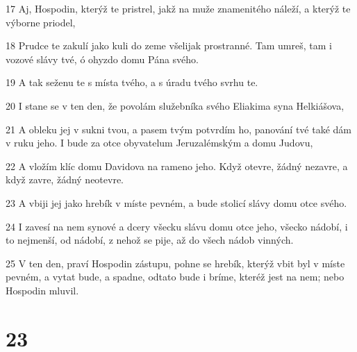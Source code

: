 \par 17 Aj, Hospodin, kterýž te pristrel, jakž na muže znamenitého náleží, a kterýž te výborne priodel,
\par 18 Prudce te zakulí jako kuli do zeme všelijak prostranné. Tam umreš, tam i vozové slávy tvé, ó ohyzdo domu Pána svého.
\par 19 A tak seženu te s místa tvého, a s úradu tvého svrhu te.
\par 20 I stane se v ten den, že povolám služebníka svého Eliakima syna Helkiášova,
\par 21 A obleku jej v sukni tvou, a pasem tvým potvrdím ho, panování tvé také dám v ruku jeho. I bude za otce obyvatelum Jeruzalémským a domu Judovu,
\par 22 A vložím klíc domu Davidova na rameno jeho. Když otevre, žádný nezavre, a když zavre, žádný neotevre.
\par 23 A vbiji jej jako hrebík v míste pevném, a bude stolicí slávy domu otce svého.
\par 24 I zavesí na nem synové a dcery všecku slávu domu otce jeho, všecko nádobí, i to nejmenší, od nádobí, z nehož se pije, až do všech nádob vinných.
\par 25 V ten den, praví Hospodin zástupu, pohne se hrebík, kterýž vbit byl v míste pevném, a vytat bude, a spadne, odtato bude i bríme, kteréž jest na nem; nebo Hospodin mluvil.

\chapter{23}

